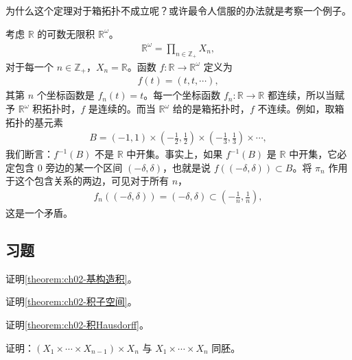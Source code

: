 \documentclass[../../main.tex]{subfiles}
\begin{document}
为什么这个定理对于箱拓扑不成立呢？或许最令人信服的办法就是考察一个例子。

\begin{example}\label{example:ch02-箱拓扑不连续}
考虑 $\mathbb{R}$ 的可数无限积 $\mathbb{R}^{\omega}$。
\begin{align*}
\mathbb{R}^{\omega} = \prod_{n \in \mathbb{Z}_{+}} X_{n},
\end{align*}
对于每一个 $n \in \mathbb{Z}_{+}$，$X_{n} = \mathbb{R}$。函数 $f: \mathbb{R} \rightarrow \mathbb{R}^{\omega}$ 定义为
\begin{align*}
f(t) = (t, t, \cdots),
\end{align*}
其第 $n$ 个坐标函数是 $f_{n}(t) = t$。每一个坐标函数 $f_{n}: \mathbb{R} \rightarrow \mathbb{R}$ 都连续，所以当赋予 $\mathbb{R}^{\omega}$ 积拓扑时，$f$ 是连续的。而当 $\mathbb{R}^{\omega}$ 给的是箱拓扑时，$f$ 不连续。例如，取箱拓扑的基元素
\begin{align*}
B = (-1, 1) \times \left(-\frac{1}{2}, \frac{1}{2}\right) \times \left(-\frac{1}{3}, \frac{1}{3}\right) \times \cdots,
\end{align*}
我们断言：$f^{-1}(B)$ 不是 $\mathbb{R}$ 中开集。事实上，如果 $f^{-1}(B)$ 是 $\mathbb{R}$ 中开集，它必定包含 0 旁边的某一个区间 $(-\delta, \delta)$，也就是说 $f((-\delta, \delta)) \subset B$。将 $\pi_{n}$ 作用于这个包含关系的两边，可见对于所有 $n$，
\begin{align*}
f_{n}((-\delta, \delta)) = (-\delta, \delta) \subset \left(-\frac{1}{n}, \frac{1}{n}\right),
\end{align*}
这是一个矛盾。
\end{example}

\subsection*{习题}

\begin{exercise}\label{exercise:ch02-积拓扑-1}
证明\cref{theorem:ch02-基构造积}。
\end{exercise}

\begin{exercise}\label{exercise:ch02-积拓扑-2}
证明\cref{theorem:ch02-积子空间}。
\end{exercise}

\begin{exercise}\label{exercise:ch02-积拓扑-3}
证明\cref{theorem:ch02-积Hausdorff}。
\end{exercise}

\begin{exercise}\label{exercise:ch02-积拓扑-4}
证明：$(X_{1} \times \cdots \times X_{n-1}) \times X_{n}$ 与 $X_{1} \times \cdots \times X_{n}$ 同胚。
\end{exercise}
\end{document}
